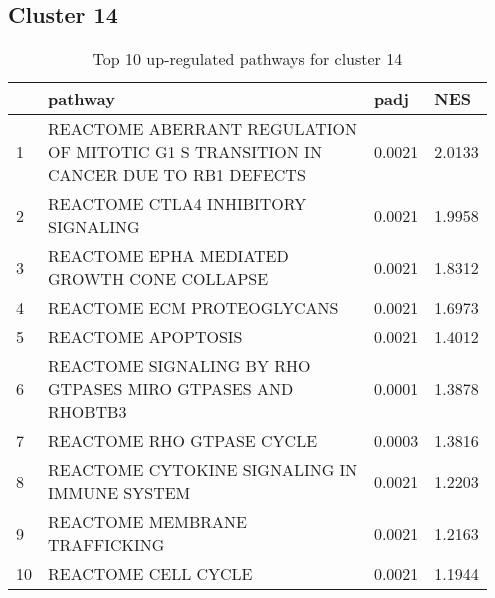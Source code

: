\documentclass{article}
\begin{document}
\subsection{Cluster 14 }
\begin{table}[H]
\centering
\begin{tabular}{p{0.05\linewidth}p{0.7\linewidth}p{0.1\linewidth}p{0.1\linewidth}}
  \hline
 & pathway & padj & NES \\ 
  \hline
1 & REACTOME ABERRANT REGULATION OF MITOTIC G1 S TRANSITION IN CANCER DUE TO RB1 DEFECTS & 0.0021 & 2.0133 \\ 
  2 & REACTOME CTLA4 INHIBITORY SIGNALING & 0.0021 & 1.9958 \\ 
  3 & REACTOME EPHA MEDIATED GROWTH CONE COLLAPSE & 0.0021 & 1.8312 \\ 
  4 & REACTOME ECM PROTEOGLYCANS & 0.0021 & 1.6973 \\ 
  5 & REACTOME APOPTOSIS & 0.0021 & 1.4012 \\ 
  6 & REACTOME SIGNALING BY RHO GTPASES MIRO GTPASES AND RHOBTB3 & 0.0001 & 1.3878 \\ 
  7 & REACTOME RHO GTPASE CYCLE & 0.0003 & 1.3816 \\ 
  8 & REACTOME CYTOKINE SIGNALING IN IMMUNE SYSTEM & 0.0021 & 1.2203 \\ 
  9 & REACTOME MEMBRANE TRAFFICKING & 0.0021 & 1.2163 \\ 
  10 & REACTOME CELL CYCLE & 0.0021 & 1.1944 \\ 
   \hline
\end{tabular}
\caption{Top 10 up-regulated pathways for cluster 14} 
\label{tab:q3_2_14}
\end{table}
\end{document}
